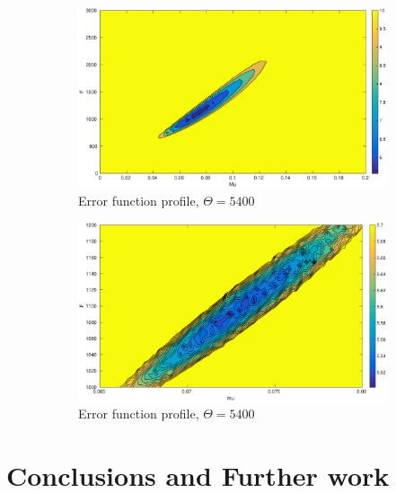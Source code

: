 \documentclass[10pt,journal]{./IEEE_latex_class/IEEEtran}
\begin{document}
 \begin{figure}[h]	
	\begin{subfigure}[h]{0.49\textwidth}
    \centering
        \includegraphics[scale = 0.23 ,clip = true, trim = 85 0 0 0]{Likelihood_profile_rough}
        \caption{ Error function profile, $\Theta = 5400$}
        \label{Likelihood_profile_rough} 
    \end{subfigure}
    	\begin{subfigure}[h]{0.49\textwidth}
    \centering
        \includegraphics[scale = 0.23 ,clip = true, trim = 85 0 0 0]{Likelihood_profile_fine}
        \caption{ Error function profile, $\Theta = 5400$}
        \label{Likelihood_profile_fine} 
    \end{subfigure}
    \caption{} 
\label{SimplifiedModelLikelihood}   
\end{figure}
  
\section{Conclusions and Further work}
\label{Conclusions and Further work}
\end{document}
